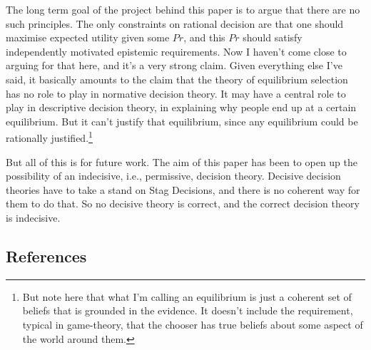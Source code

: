 \documentclass[
  12pt,
]{article}
\begin{document}
The long term goal of the project behind this paper is to argue that
there are no such principles. The only constraints on rational decision
are that one should maximise expected utility given some \(Pr\), and
this \(Pr\) should satisfy independently motivated epistemic
requirements. Now I haven't come close to arguing for that here, and
it's a very strong claim. Given everything else I've said, it basically
amounts to the claim that the theory of equilibrium selection has no
role to play in normative decision theory. It may have a central role to
play in descriptive decision theory, in explaining why people end up at
a certain equilibrium. But it can't justify that equilibrium, since any
equilibrium could be rationally justified.\footnote{But note here that
  what I'm calling an equilibrium is just a coherent set of beliefs that
  is grounded in the evidence. It doesn't include the requirement,
  typical in game-theory, that the chooser has true beliefs about some
  aspect of the world around them.}

But all of this is for future work. The aim of this paper has been to
open up the possibility of an indecisive, i.e., permissive, decision
theory. Decisive decision theories have to take a stand on Stag
Decisions, and there is no coherent way for them to do that. So no
decisive theory is correct, and the correct decision theory is
indecisive.

\hypertarget{references}{%
\subsection*{References}\label{references}}
\end{document}
